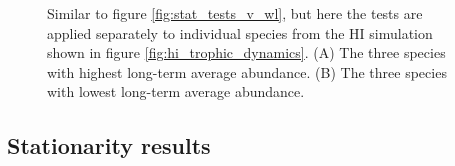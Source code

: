 
\begin{figure}[hp]
	\centering
     \caption{Similar to figure \ref{fig:stat_tests_v_wl}, but here the tests are applied separately to individual species from the HI simulation shown in figure \ref{fig:hi_trophic_dynamics}. (A) The three species with highest long-term average abundance. (B) The three species with lowest long-term average abundance.} 
     \label{fig:sp_stat_tests_v_wl}   
\end{figure}

\newpage
\subsection{Stationarity results}
\label{sec:ensemble}


